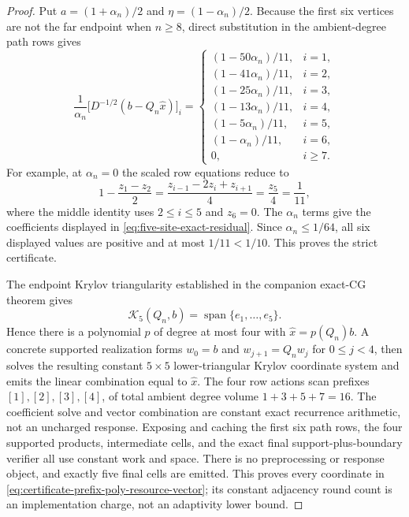 \begin{proof}
Put $a=(1+\alpha_n)/2$ and $\eta=(1-\alpha_n)/2$.  Because the first six
vertices are not the far endpoint when $n\geq8$, direct substitution in the
ambient-degree path rows gives
\begin{equation}
 \frac{1}{\alpha_n}
 \bigl[D^{-1/2}(b-Q_n\widehat x)\bigr]_i
 =
 \begin{cases}
  (1-50\alpha_n)/11,&i=1,\\
  (1-41\alpha_n)/11,&i=2,\\
  (1-25\alpha_n)/11,&i=3,\\
  (1-13\alpha_n)/11,&i=4,\\
  (1-5\alpha_n)/11,&i=5,\\
  (1-\alpha_n)/11,&i=6,\\
  0,&i\geq7.
 \end{cases}
 \label{eq:five-site-exact-residual}
\end{equation}
For example, at $\alpha_n=0$ the scaled row equations reduce to
\[
 1-\frac{z_1-z_2}{2}
 =\frac{z_{i-1}-2z_i+z_{i+1}}4
 =\frac{z_5}{4}=\frac1{11},
\]
where the middle identity uses $2\leq i\leq5$ and $z_6=0$.
The $\alpha_n$ terms give the coefficients displayed in
\cref{eq:five-site-exact-residual}.  Since
$\alpha_n\leq1/64$, all six displayed values are positive and at most
$1/11<1/10$.  This proves the strict certificate.

The endpoint Krylov triangularity established in the companion exact-CG
theorem gives
\[
 \mathcal K_5(Q_n,b)
 =\operatorname{span}\{e_1,\ldots,e_5\}.
\]
Hence there is a polynomial $p$ of degree at most four with
$\widehat x=p(Q_n)b$.  A concrete supported realization forms
$w_0=b$ and $w_{j+1}=Q_nw_j$ for $0\leq j<4$, then solves the resulting
constant $5\times5$ lower-triangular Krylov coordinate system and emits the
linear combination equal to $\widehat x$.  The four row actions scan prefixes
$[1],[2],[3],[4]$, of total ambient degree volume
$1+3+5+7=16$.  The coefficient solve and vector combination are constant
exact recurrence arithmetic, not an uncharged response.  Exposing and caching
the first six path rows, the four supported products, intermediate cells, and
the exact final support-plus-boundary verifier all use constant work and
space.  There is no preprocessing or response object, and exactly five final
cells are emitted.  This proves every coordinate in
\cref{eq:certificate-prefix-poly-resource-vector}; its constant adjacency
round count is an implementation charge, not an adaptivity lower bound.


\end{proof}
